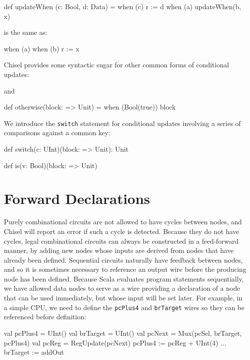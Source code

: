 \documentclass[10pt,twocolumn]{article}
\def\code#1{{\small\tt #1}}
\begin{document}
\begin{scala}
def updateWhen (c: Bool, d: Data) =
  when (c) { r := d }
when (a) { 
  updateWhen(b, x)
}
\end{scala}

\noindent
is the same as:

\begin{scala}
when (a) { 
  when (b) { r := x } 
}
\end{scala}


Chisel provides some syntactic sugar for other common forms of
conditional updates:

\begin{scala}
def unless(c: Bool)(block: => Unit) = 
  when (!c) { block )
\end{scala}

\noindent 
and

\begin{scala}
def otherwise(block: => Unit) = 
  when (Bool(true)) { block }
\end{scala}

We introduce the \code{switch} statement for conditional updates
involving a series of comparisons against a common key:

\begin{scala}
def switch(c: UInt)(block: => Unit): Unit

def is(v: Bool)(block: => Unit)
\end{scala}

\section{Forward Declarations}

Purely combinational circuits are not allowed to have cycles between
nodes, and Chisel will report an error if such a cycle is detected.
Because they do not have cycles, legal combinational circuits can
always be constructed in a feed-forward manner, by adding new nodes
whose inputs are derived from nodes that have already been defined.
Sequential circuits naturally have feedback between nodes, and so it
is sometimes necessary to reference an output wire before the
producing node has been defined.  Because Scala evaluates program
statements sequentially, we have allowed data nodes to serve as a wire
providing a declaration of a node that can be used immediately, but
whose input will be set later.  For example, in a simple CPU, we need
to define the \verb!pcPlus4!  and \verb!brTarget! wires so they can be
referenced before definition:
\begin{scala}
val pcPlus4  = UInt()
val brTarget = UInt()
val pcNext   = Mux(pcSel, brTarget, pcPlus4)
val pcReg    = RegUpdate(pcNext)
pcPlus4     := pcReg + UInt(4)
...
brTarget    := addOut
\end{scala}
\end{document}
